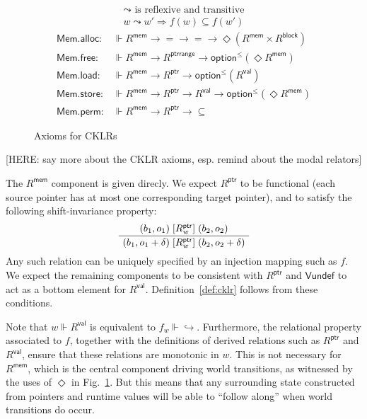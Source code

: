 \documentclass[sigplan,10pt,review,anonymous]{acmart}
\newcommand{\kw}[1]{\ensuremath{ \mathsf{#1} }}
\newcommand{\ifr}[1]{\mathrel{[{#1}]}}
\begin{document}
\begin{figure} %
  \begin{gather*}
    {\leadsto} \mbox{ is reflexive and transitive} \\
    w \leadsto w' \Rightarrow f(w) \subseteq f(w')
  \end{gather*}
  \begin{align*}
      \kw{Mem.alloc} :
        &\Vdash R^\kw{mem} \rightarrow {=} \rightarrow {=} \rightarrow
        \Diamond (R^\kw{mem} \times R^\kw{block})
      \\
      \kw{Mem.free} :
        &\Vdash R^\kw{mem} \rightarrow R^\kw{ptrrange} \rightarrow
        \kw{option}^\le(\Diamond R^\kw{mem})
      \\
      \kw{Mem.load} :
        &\Vdash R^\kw{mem} \rightarrow R^\kw{ptr} \rightarrow
        \kw{option}^\le(R^\kw{val})
      \\
      \kw{Mem.store} :
        &\Vdash R^\kw{mem} \rightarrow R^\kw{ptr} \rightarrow R^\kw{val} \rightarrow
        \kw{option}^\le(\Diamond R^\kw{mem})
      \\
      \kw{Mem.perm} :
        &\Vdash R^\kw{mem} \rightarrow R^\kw{ptr} \rightarrow {\subseteq}
  \end{align*}
  \caption{Axioms for CKLRs}
  \label{fig:cklr-def}
\end{figure}

[HERE: say more about the CKLR axioms,
esp. remind about the modal relators]

The $R^\kw{mem}$ component is given direcly.
We expect $R^\kw{ptr}$ to be functional
(each source pointer has at most one corresponding target pointer),
and to satisfy the following shift-invariance property:
\[
  \AxiomC{$(b_1, o_1) \ifr{R^\kw{ptr}_w} (b_2, o_2)$}
  \UnaryInfC{$(b_1, o_1 + \delta) \ifr{R^\kw{ptr}_w} (b_2, o_2 + \delta)$}
  \DisplayProof
\]
Any such relation can be uniquely specified by
an injection mapping such as $f$.
We expect the remaining components to be consistent with $R^\kw{ptr}$
and $\kw{Vundef}$ to act as a bottom element for $R^\kw{val}$.
Definition~\ref{def:cklr} follows from these conditions.

Note that $w \Vdash R^\kw{val}$
is equivalent to $f_w \Vdash {\hookrightarrow}$.
Furthermore, the relational property associated to $f$,
together with the definitions of
derived relations such as $R^\kw{ptr}$ and $R^\kw{val}$,
ensure that these relations are monotonic in $w$.
This is not necessary for $R^\kw{mem}$,
which is the central component driving world transitions,
as witnessed by the uses of $\Diamond$ in Fig.~\ref{fig:cklr-def}.
But this means that any surrounding state
constructed from pointers and runtime values
will be able to ``follow along'' when
world transitions do occur.
\end{document}
